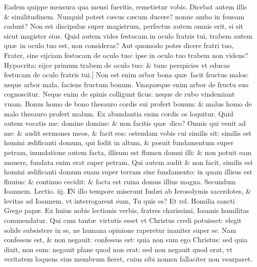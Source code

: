 \documentclass[a5paper,10pt]{book}
\def\leftmarginnote{%
	\lrmarginnote{\hskip -\marginparsep \hskip -6.5em}}
\def\rightmarginnote{%
	\lrmarginnote{\hskip\columnwidth \hskip -1em}}
\def\ae{æ}
\begin{document}
\begin{multicols*}{2}
Eadem quippe mensura qua mensi fueritis, remetietur vobis.
Dicebat autem illis \& similitudinem. Nunquid potest c\ae cus c\ae cum ducere? nonne ambo in foueam cadunt?
Non est discipulus super magistrum, perfectus autem omnis erit, si sit sicut magister eius.
Quid autem vides festucam in oculo fratris tui, trabem autem qu\ae \ in oculo tuo est, non consideras?
Aut quomodo potes dicere fratri tuo, Frater, sine eijciam festucam de oculo tuo: ipse in oculo tuo trabem non videns?
Hypocrita: eijce primum trabem de oculo tuo: \& tunc perspicies vt educas festucam de oculo fratris tui.]
Non\leftmarginnote{\begin{flushright}E\end{flushright}} est enim arbor bona qu\ae \ facit fructus malos: neque arbor mala, faciens fructum bonum.
Vnaqu\ae que enim arbor de fructu suo cognoscitur.
Neque enim de spinis colligunt ficus: neque de rubo vindemiant vuam.
Bonus homo de bono thesauro cordis sui profert bonum: \& malus homo de malo thesauro profert malum.
Ex abundantia enim cordis os loquitur.
Quid autem vocatis me: 
domine domine: \& non facitis qu\ae \ dico?
Omnis qui venit ad me: \& audit sermones meos, \& facit eos: ostendam vobis cui similis sit: similis est homini \ae dificanti domum, qui fodit in altum, \& posuit fundamentum super petram, inundatione autem facta, illisum est flumen domui illi: \& non potuit eam mouere, fundata enim erat super petram.
Qui autem audit \& non facit, similis est homini \ae dificanti domum suam super terram sine fundamento: in quam illisus est fluuius: \& continuo cecidit: \& facta est ruina domus illius magna.
\newline \color{red} Secundum Ioannem. \hfill Lectio. iij. \color{black}
\vspace{-.25em}
\lettrine[lines=2]{\bfseries \color{red} I}{}N\rightmarginnote{ca. 1.} illo tempore miserunt Iud\ae i ab Ierosolymis sacerdotes, \& levitas ad Ioannem, vt interrogarent eum, Tu quis es?
\newline \color{red} Et rel. Homilia sancti Grego pap\ae . \color{black}
\newline \color{red} E\color{black}x huius nobis lectionis verbis, fratres charissimi, Ioannis humilitas commendatur.
Qui cum tant\ae \ virtutis esset vt Christus credi potuisset: elegit solide subsistere in se, ne humana opinione raperetur inaniter super se.
Nam confessus est, \& non negauit: confessus est: quia non sum ego Christus: sed quia dixit, non sum: negauit plane quod non erat: sed non negauit quod erat, vt veritatem loquens eius membrum fieret, cuius sibi nomen fallaciter non vsurparet.

\end{multicols*}
\end{document}
